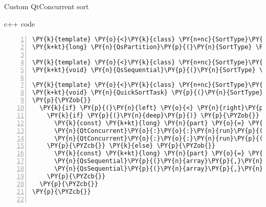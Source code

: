 \documentclass{beamer}
\begin{document}


\begin{frame}[fragile]{Custom QtConcurrent sort}

\begin{block}{c++ code}

\tiny
\begin{Verbatim}[commandchars=\\\{\},numbers=left,firstnumber=1,stepnumber=1]
\PY{k}{template} \PY{o}{<}\PY{k}{class} \PY{n+nc}{SortType}\PY{o}{>}
\PY{k+kt}{long} \PY{n}{QsPartition}\PY{p}{(}\PY{n}{SortType} \PY{n}{outputArray}\PY{p}{[}\PY{p}{]}\PY{p}{,} \PY{k+kt}{long} \PY{n}{left}\PY{p}{,} \PY{k+kt}{long} \PY{n}{right}\PY{p}{)} \PY{p}{\PYZob{}} \PY{p}{.}\PY{p}{.}\PY{p}{.} \PY{p}{\PYZcb{}}

\PY{k}{template} \PY{o}{<}\PY{k}{class} \PY{n+nc}{SortType}\PY{o}{>}
\PY{k+kt}{void} \PY{n}{QsSequential}\PY{p}{(}\PY{n}{SortType} \PY{n}{array}\PY{p}{[}\PY{p}{]}\PY{p}{,} \PY{k}{const} \PY{k+kt}{long} \PY{n}{left}\PY{p}{,} \PY{k}{const} \PY{k+kt}{long} \PY{n}{right}\PY{p}{)} \PY{p}{\PYZob{}} \PY{p}{.}\PY{p}{.}\PY{p}{.} \PY{p}{\PYZcb{}}

\PY{k}{template} \PY{o}{<}\PY{k}{class} \PY{n+nc}{SortType}\PY{o}{>}
\PY{k+kt}{void} \PY{n}{QuickSortTask} \PY{p}{(}\PY{n}{SortType} \PY{n}{array}\PY{p}{[}\PY{p}{]}\PY{p}{,} \PY{k}{const} \PY{k+kt}{long} \PY{n}{left}\PY{p}{,} \PY{k}{const} \PY{k+kt}{long} \PY{n}{right}\PY{p}{,} \PY{k}{const} \PY{k+kt}{int} \PY{n}{deep}\PY{p}{)}
\PY{p}{\PYZob{}}
  \PY{k}{if} \PY{p}{(}\PY{n}{left} \PY{o}{<} \PY{n}{right}\PY{p}{)} \PY{p}{\PYZob{}}
    \PY{k}{if} \PY{p}{(}\PY{n}{deep}\PY{p}{)} \PY{p}{\PYZob{}}
      \PY{k}{const} \PY{k+kt}{long} \PY{n}{part} \PY{o}{=} \PY{n}{QsPartition}\PY{p}{(}\PY{n}{array}\PY{p}{,} \PY{n}{left}\PY{p}{,} \PY{n}{right}\PY{p}{)}\PY{p}{;}
      \PY{n}{QtConcurrent}\PY{o}{:}\PY{o}{:}\PY{n}{run}\PY{p}{(}\PY{n}{QuickSortTask}\PY{o}{<}\PY{n}{SortType}\PY{o}{>}\PY{p}{,} \PY{n}{array}\PY{p}{,} \PY{n}{part} \PY{o}{+} \PY{l+m+mi}{1}\PY{p}{,} \PY{n}{right}\PY{p}{,} \PY{n}{deep} \PY{o}{-} \PY{l+m+mi}{1}\PY{p}{)}\PY{p}{;}
      \PY{n}{QtConcurrent}\PY{o}{:}\PY{o}{:}\PY{n}{run}\PY{p}{(}\PY{n}{QuickSortTask}\PY{o}{<}\PY{n}{SortType}\PY{o}{>}\PY{p}{,} \PY{n}{array}\PY{p}{,} \PY{n}{left}\PY{p}{,} \PY{n}{part} \PY{o}{-} \PY{l+m+mi}{1}\PY{p}{,} \PY{n}{deep} \PY{o}{-} \PY{l+m+mi}{1}\PY{p}{)}\PY{p}{;}
    \PY{p}{\PYZcb{}} \PY{k}{else} \PY{p}{\PYZob{}}
      \PY{k}{const} \PY{k+kt}{long} \PY{n}{part} \PY{o}{=} \PY{n}{QsPartition}\PY{p}{(}\PY{n}{array}\PY{p}{,} \PY{n}{left}\PY{p}{,} \PY{n}{right}\PY{p}{)}\PY{p}{;}
      \PY{n}{QsSequential}\PY{p}{(}\PY{n}{array}\PY{p}{,}\PY{n}{part} \PY{o}{+} \PY{l+m+mi}{1}\PY{p}{,}\PY{n}{right}\PY{p}{)}\PY{p}{;}
      \PY{n}{QsSequential}\PY{p}{(}\PY{n}{array}\PY{p}{,}\PY{n}{left}\PY{p}{,}\PY{n}{part} \PY{o}{-} \PY{l+m+mi}{1}\PY{p}{)}\PY{p}{;}
    \PY{p}{\PYZcb{}}
  \PY{p}{\PYZcb{}}
\PY{p}{\PYZcb{}}


\end{Verbatim}
\end{block}
\end{frame}
\end{document}
